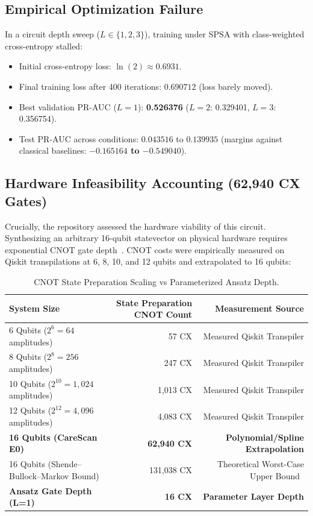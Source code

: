 \documentclass[11pt,a4paper]{report}
\begin{document}
\subsection{Empirical Optimization Failure}
In a circuit depth sweep ($L \in \{1, 2, 3\}$), training under SPSA with class-weighted cross-entropy stalled:
\begin{itemize}
  \item Initial cross-entropy loss: $\ln(2) \approx 0.6931$.
  \item Final training loss after 400 iterations: $0.690712$ (loss barely moved).
  \item Best validation PR-AUC ($L=1$): \textbf{0.526376} ($L=2$: 0.329401, $L=3$: 0.356754).
  \item Test PR-AUC across conditions: $0.043516$ to $0.139935$ (margins against classical baselines: \textbf{$-0.165164$ to $-0.549040$}).
\end{itemize}

\subsection{Hardware Infeasibility Accounting (62,940 CX Gates)}
Crucially, the repository assessed the hardware viability of this circuit. Synthesizing an arbitrary 16-qubit statevector on physical hardware requires exponential CNOT gate depth~\cite{shende2006synthesis}. CNOT costs were empirically measured on Qiskit transpilations at 6, 8, 10, and 12 qubits and extrapolated to 16 qubits:

\begin{table}[H]
\centering
\small
\begin{tabular}{lrr}
\toprule
\textbf{System Size} & \textbf{State Preparation CNOT Count} & \textbf{Measurement Source} \\
\midrule
6 Qubits ($2^6 = 64$ amplitudes) & 57 CX & Measured Qiskit Transpiler \\
8 Qubits ($2^8 = 256$ amplitudes) & 247 CX & Measured Qiskit Transpiler \\
10 Qubits ($2^{10} = 1,024$ amplitudes) & 1,013 CX & Measured Qiskit Transpiler \\
12 Qubits ($2^{12} = 4,096$ amplitudes) & 4,083 CX & Measured Qiskit Transpiler \\
\midrule
\textbf{16 Qubits (CareScan E0)} & \textbf{62,940 CX} & \textbf{Polynomial/Spline Extrapolation} \\
16 Qubits (Shende--Bullock--Markov Bound) & 131,038 CX & Theoretical Worst-Case Upper Bound~\cite{shende2006synthesis} \\
\textbf{Ansatz Gate Depth (L=1)} & \textbf{16 CX} & \textbf{Parameter Layer Depth} \\
\bottomrule
\end{tabular}
\caption{CNOT State Preparation Scaling vs Parameterized Ansatz Depth.}
\label{tab:cx_scaling}
\end{table}
\end{document}
